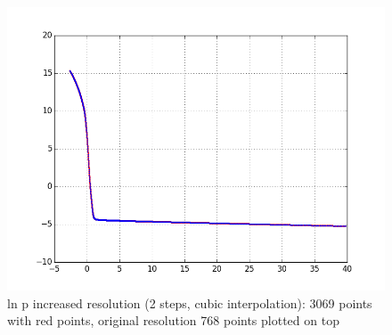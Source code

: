 \documentclass[10pt]{book}
\begin{document}
\begin{figure}[H]
 \centering
 \includegraphics[scale=0.5]{testData3069.png}
 \caption{ln p increased resolution (2 steps, cubic interpolation): 3069 points with red points, original resolution 768 points plotted on top}
\end{figure}
\end{document}
